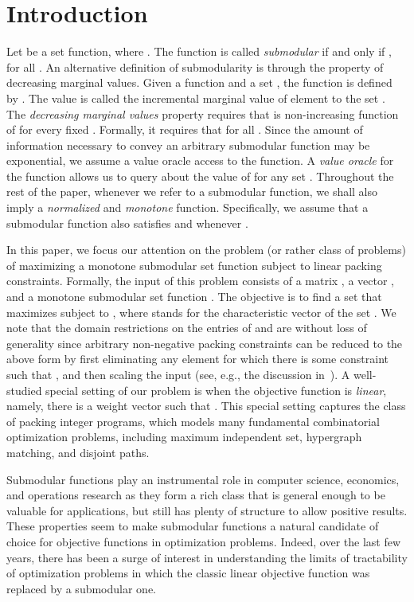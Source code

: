 \documentclass[11pt]{article}
\theoremstyle{plain}
\theoremstyle{definition}
\begin{document}
\section{Introduction} \label{sec:Intro} Let  be a set function, where . The function  is called \emph{submodular} if and only if
, for all . An alternative definition of submodularity is
through the property of decreasing marginal values. Given a
function  and a set , the function  is defined by . The value  is called the incremental marginal value
of element  to the set . The \emph{decreasing marginal
values} property requires that  is non-increasing function
of  for every fixed . Formally, it requires that  for all . Since the amount of
information necessary to convey an arbitrary submodular function
may be exponential, we assume a value oracle access to the
function. A \emph{value oracle} for the function  allows us to
query about the value of  for any set . Throughout the
rest of the paper, whenever we refer to a submodular function, we
shall also imply a \emph{normalized} and \emph{monotone} function.
Specifically, we assume that a submodular function  also
satisfies  and  whenever .

In this paper, we focus our attention on the problem (or rather
class of problems) of maximizing a monotone submodular set
function subject to linear packing constraints. Formally, the
input of this problem consists of a matrix , a vector , and a monotone submodular set
function . The objective is to find
a set  that maximizes  subject to , where
 stands for the characteristic vector of the set . We note
that the domain restrictions on the entries of  and  are
without loss of generality since arbitrary non-negative packing
constraints can be reduced to the above form by first eliminating
any element  for which there is some constraint  such that
, and then scaling the input (see, e.g., the
discussion in~\cite{Srinivasan99}). A well-studied special setting
of our problem is when the objective function  is
\emph{linear}, namely, there is a weight vector 
such that . This special setting
captures the class of packing integer programs, which models many
fundamental combinatorial optimization problems, including maximum
independent set, hypergraph matching, and disjoint paths.


\medskip {}
Submodular functions play an instrumental role in computer
science, economics, and operations research as they form a rich
class that is general enough to be valuable for applications, but
still has plenty of structure to allow positive results. These
properties seem to make submodular functions a natural candidate
of choice for objective functions in optimization problems.
Indeed, over the last few years, there has been a surge of
interest in understanding the limits of tractability of
optimization problems in which the classic linear objective
function was replaced by a submodular one.
\end{document}
